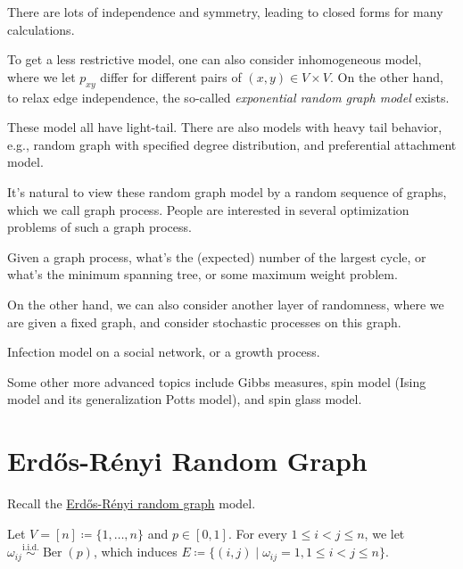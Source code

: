 \begin{note}
	There are lots of independence and symmetry, leading to closed forms for many calculations.
\end{note}

To get a less restrictive model, one can also consider inhomogeneous model, where we let \(p_{xy}\) differ for different pairs of \((x , y) \in V \times V\). On the other hand,  to relax edge independence, the so-called \emph{exponential random graph model} exists.

\begin{remark}
	These model all have light-tail. There are also models with heavy tail behavior, e.g., random graph with specified degree distribution, and preferential attachment model.
\end{remark}

It's natural to view these random graph model by a random sequence of graphs, which we call graph process. People are interested in several optimization problems of such a graph process.

\begin{eg}
	Given a graph process, what's the (expected) number of the largest cycle, or what's the minimum spanning tree, or some maximum weight problem.
\end{eg}

On the other hand, we can also consider another layer of randomness, where we are given a fixed graph, and consider stochastic processes on this graph.

\begin{eg}
	Infection model on a social network, or a growth process.
\end{eg}

Some other more advanced topics include Gibbs measures, spin model (Ising model and its generalization Potts model), and spin glass model.

\section{Erdős-Rényi Random Graph}
Recall the \hyperref[def:Erdős-Rényi-random-graph]{Erdős-Rényi random graph} model.

\begin{prev}
	Let \(V = [n] \coloneqq \{ 1, \dots , n \} \) and \(p \in [0, 1]\). For every \(1 \leq i < j \leq n\), we let \(\omega _{ij} \overset{\text{i.i.d.} }{\sim } \operatorname{Ber}(p) \), which induces \(E \coloneqq \{ (i, j) \mid \omega _{ij} = 1, 1 \leq i < j \leq n\} \).
\end{prev}

